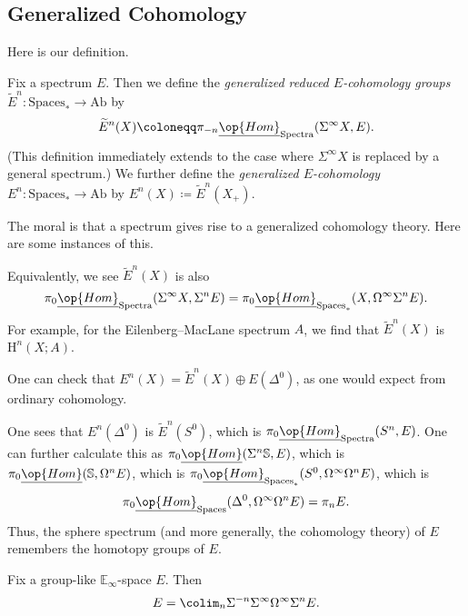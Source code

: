 \documentclass[../notes.tex]{subfiles}
\begin{document}
\subsection{Generalized Cohomology}
Here is our definition.
\begin{definition}
	Fix a spectrum $E$. Then we define the \textit{generalized reduced $E$-coho\-mo\-logy groups} $\widetilde E^n\colon\mathrm{Spaces}_*\to\mathrm{Ab}$ by
	\[\widetilde E^n(X)\coloneqq\pi_{-n}\underline{\op{Hom}}_{\mathrm{Spectra}}(\Sigma^\infty X,E).\]
	(This definition immediately extends to the case where $\Sigma^\infty X$ is replaced by a general spectrum.) We further define the \textit{generalized $E$-cohomology} $E^n\colon\mathrm{Spaces}_*\to\mathrm{Ab}$ by $E^n(X)\coloneqq\widetilde E^n(X_+)$.
\end{definition}
The moral is that a spectrum gives rise to a generalized cohomology theory. Here are some instances of this.
\begin{remark}
	Equivalently, we see $\widetilde E^n(X)$ is also
	\[\pi_0\underline{\op{Hom}}_{\mathrm{Spectra}}(\Sigma^\infty X,\Sigma^nE)=\pi_0\underline{\op{Hom}}_{\mathrm{Spaces}_*}(X,\Omega^\infty\Sigma^nE).\]
	For example, for the Eilenberg--MacLane spectrum $A$, we find that $\widetilde E^n(X)$ is $\mathrm H^n(X;A)$.
\end{remark}
\begin{remark}
	One can check that $E^n(X)=\widetilde E^n(X)\oplus E\left(\Delta^0\right)$, as one would expect from ordinary cohomology.
\end{remark}
\begin{remark} \label{rem:cohomology-on-point}
	One sees that $E^n\left(\Delta^0\right)$ is $\widetilde E^n\left(S^0\right)$, which is $\pi_0\underline{\op{Hom}}_{\mathrm{Spectra}}(S^n,E)$. One can further calculate this as $\pi_0\underline{\op{Hom}}(\Sigma^n\mathbb S,E)$, which is $\pi_0\underline{\op{Hom}}(\mathbb S,\Omega^nE)$, which is $\pi_0\underline{\op{Hom}}_{\mathrm{Spaces}_*}(S^0,\Omega^\infty\Omega^nE)$, which is
	\[\pi_0\underline{\op{Hom}}_{\mathrm{Spaces}}(\Delta^0,\Omega^\infty\Omega^nE)=\pi_nE.\]
	Thus, the sphere spectrum (and more generally, the cohomology theory) of $E$ remembers the homotopy groups of $E$.
\end{remark}
\begin{lemma} \label{lem:e-infinity-spectra-as-colim}
	Fix a group-like $\mathbb E_\infty$-space $E$. Then
	\[E=\colim_n\Sigma^{-n}\Sigma^\infty\Omega^\infty\Sigma^nE.\]
\end{lemma}
\end{document}
